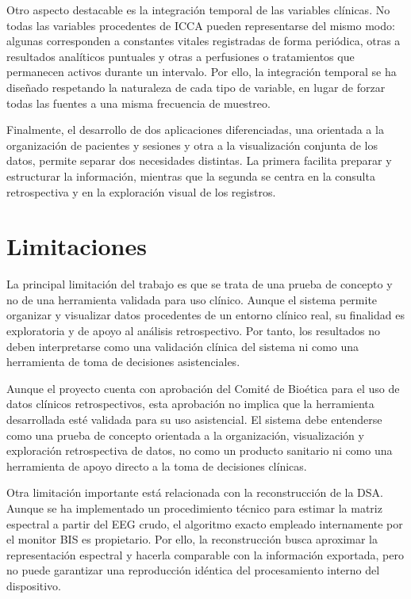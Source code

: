 \documentclass[
  spanish,
  a4paper,
  12pt,
  twoside]{memoir}
\begin{document}
Otro aspecto destacable es la integración temporal de las variables
clínicas. No todas las variables procedentes de ICCA pueden
representarse del mismo modo: algunas corresponden a constantes vitales
registradas de forma periódica, otras a resultados analíticos puntuales
y otras a perfusiones o tratamientos que permanecen activos durante un
intervalo. Por ello, la integración temporal se ha diseñado respetando
la naturaleza de cada tipo de variable, en lugar de forzar todas las
fuentes a una misma frecuencia de muestreo.

Finalmente, el desarrollo de dos aplicaciones diferenciadas, una
orientada a la organización de pacientes y sesiones y otra a la
visualización conjunta de los datos, permite separar dos necesidades
distintas. La primera facilita preparar y estructurar la información,
mientras que la segunda se centra en la consulta retrospectiva y en la
exploración visual de los registros.

\section{Limitaciones}\label{limitaciones}

La principal limitación del trabajo es que se trata de una prueba de
concepto y no de una herramienta validada para uso clínico. Aunque el
sistema permite organizar y visualizar datos procedentes de un entorno
clínico real, su finalidad es exploratoria y de apoyo al análisis
retrospectivo. Por tanto, los resultados no deben interpretarse como una
validación clínica del sistema ni como una herramienta de toma de
decisiones asistenciales.

Aunque el proyecto cuenta con aprobación del Comité de Bioética para el
uso de datos clínicos retrospectivos, esta aprobación no implica que la
herramienta desarrollada esté validada para su uso asistencial. El
sistema debe entenderse como una prueba de concepto orientada a la
organización, visualización y exploración retrospectiva de datos, no
como un producto sanitario ni como una herramienta de apoyo directo a la
toma de decisiones clínicas.

Otra limitación importante está relacionada con la reconstrucción de la
DSA. Aunque se ha implementado un procedimiento técnico para estimar la
matriz espectral a partir del EEG crudo, el algoritmo exacto empleado
internamente por el monitor BIS es propietario. Por ello, la
reconstrucción busca aproximar la representación espectral y hacerla
comparable con la información exportada, pero no puede garantizar una
reproducción idéntica del procesamiento interno del dispositivo.
\end{document}
